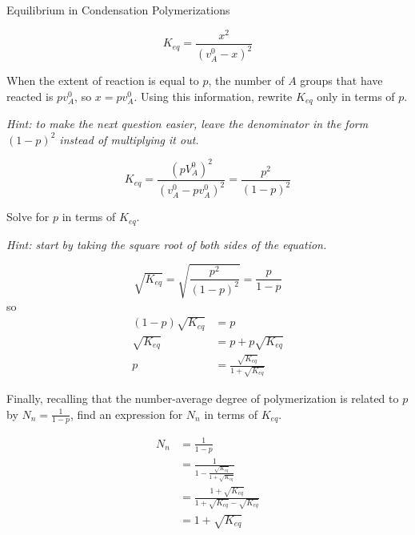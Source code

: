 \begin{activity}{Equilibrium in Condensation Polymerizations}
\begin{ctqs}
		\begin{solution}[1.05in]{}
			\begin{equation*}
				K_{eq} = \frac{x^2}{(v_A^0-x)^2}
			\end{equation*}
		\end{solution}
	
	\question  When the extent of reaction is equal to $p$, the number of $A$ groups that have reacted is $pv_A^0$, so $x=pv_A^0$.   Using this information, rewrite $K_{eq}$ only in terms of $p$.
	
		\emph{Hint: to make the next question easier, leave the denominator in the form $(1-p)^2$ instead of multiplying it out.}
		
		\begin{solution}[1.25in]{}
			\begin{equation*}
				K_{eq} = \frac{(pV_A^0)^2}{(v_A^0 - pv_A^0)^2} = \frac{p^2}{(1-p)^2}
			\end{equation*}
		\end{solution}
		
	\question Solve for $p$ in terms of $K_{eq}$.
	\label{\labelbase:ctq:Keqp}
		
		\emph{Hint: start by taking the square root of both sides of the equation.}
	
		\begin{solution}[3.25in]{}
			\begin{equation*}
				\sqrt{K_{eq}} = \sqrt{\frac{p^2}{(1-p)^2}} = \frac{p}{1-p}
			\end{equation*}
			so
			\begin{align*}
				(1-p)\sqrt{K_{eq}} &= p\\
				\sqrt{K_{eq}} &= p + p\sqrt{K_{eq}}  \\
				p &= \frac{\sqrt{K_{eq}}}{1+\sqrt{K_{eq}}}
			\end{align*}
		\end{solution}
	
	
	\question Finally, recalling that the number-average degree of polymerization is related to $p$ by $N_n = \frac{1}{1-p}$, find an expression for $N_n$ in terms of $K_{eq}$.
		
		\begin{solution}[2.5in]{}
			\begin{align*}
				N_n &= \frac{1}{1-p} \\
				&= \frac{1}{1-\frac{\sqrt{K_{eq}}}{1+\sqrt{K_{eq}}}}\\
				&= \frac{1+\sqrt{K_{eq}}}{1+\sqrt{K_{eq}} - \sqrt{K_{eq}}}\\
				&= 1+ \sqrt{K_{eq}}
			\end{align*}
		\end{solution}
		

\end{ctqs}
\end{activity}

